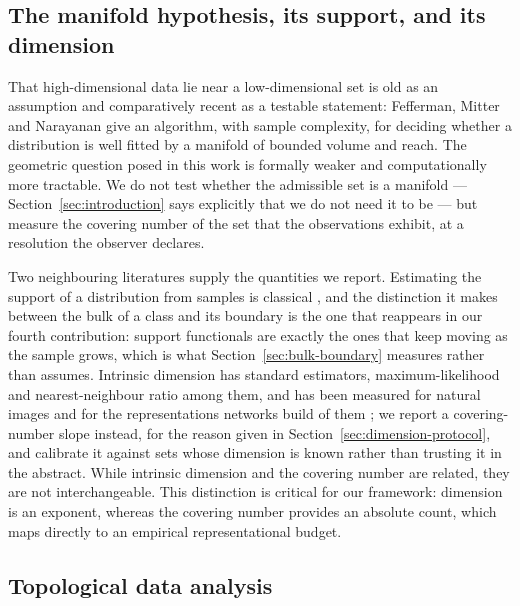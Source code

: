 \documentclass[10pt]{article}
\theoremstyle{plain}
\theoremstyle{definition}
\theoremstyle{remark}
\begin{document}
\subsection{The manifold hypothesis, its support, and its dimension}
\label{sec:rw-manifold-hypothesis}

That high-dimensional data lie near a low-dimensional set is old as an
assumption \citep{tenenbaum2000global, bengio2013representation} and
comparatively recent as a testable statement: Fefferman, Mitter and Narayanan
\citep{fefferman2016testing} give an algorithm, with sample complexity, for
deciding whether a distribution is well fitted by a manifold of bounded volume
and reach. The geometric question posed in this work is formally weaker and
computationally more tractable. We do not test whether the admissible set is a
manifold --- Section~\ref{sec:introduction}
says explicitly that we do not need it to be --- but measure the covering
number of the set that the observations exhibit, at a resolution the observer
declares.

Two neighbouring literatures supply the quantities we report. Estimating the
support of a distribution from samples is classical
\citep{devroye1980detection, scholkopf2001estimating}, and the distinction it
makes between the bulk of a class and its boundary is the one that reappears in
our fourth contribution: support functionals are exactly the ones that keep
moving as the sample grows, which is what Section~\ref{sec:bulk-boundary}
measures rather than assumes. Intrinsic dimension has standard estimators,
maximum-likelihood \citep{levina2004maximum} and nearest-neighbour ratio
\citep{facco2017twonn} among them, and has been measured for natural images and
for the representations networks build of them
\citep{pope2021intrinsic, ansuini2019intrinsic}; we report a covering-number
slope instead, for the reason given in
Section~\ref{sec:dimension-protocol}, and calibrate it against sets whose
dimension is known rather than trusting it in the abstract. While intrinsic dimension and the covering number are related, they are not
interchangeable. This distinction is critical for our framework: dimension is an
exponent, whereas the covering number provides an absolute count, which maps
directly to an empirical representational budget.

\subsection{Topological data analysis}
\label{sec:rw-tda}
\end{document}

